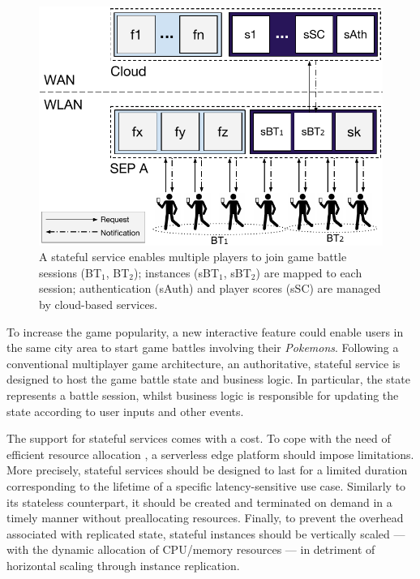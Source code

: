 \begin{figure}[tbp]
	\centering
	\includegraphics[width=\linewidth]{Figs/Stateful_Edge_Services.pdf}
	\caption{A stateful service enables multiple players to join game battle sessions (BT$_1$, BT$_2$); instances (sBT$_1$, sBT$_2$) are mapped to each session; authentication (sAuth) and player scores (sSC) are managed by cloud-based services.}
	\label{fig:Steteful_Edge_MMG}
\end{figure}

To increase the game popularity, a new interactive feature could enable users in the same city area to start game battles involving their \textit{Pokemons}. Following a conventional multiplayer game architecture, an authoritative, stateful service is designed to host the game battle state and business logic. In particular, the state represents a battle session, whilst business logic is responsible for updating the state according to user inputs and other events. 

The support for stateful services comes with a cost. To %
cope with the need of efficient resource allocation
, a serverless edge platform should impose limitations. More precisely, stateful services should be designed to last for a limited duration corresponding to the lifetime of a specific latency-sensitive use case. Similarly to its stateless counterpart, it should be created and terminated on demand in a timely manner without preallocating resources. Finally, to prevent the overhead associated with replicated state, stateful instances should be vertically scaled --- with the dynamic allocation of CPU/memory resources --- in detriment of horizontal scaling through instance replication.

